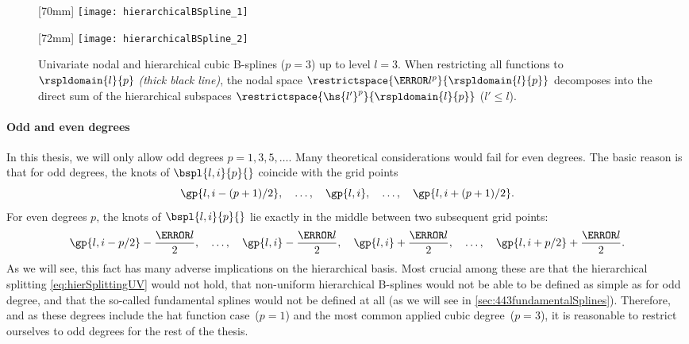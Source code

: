\begin{figure}
  [70mm]{%
    \texttt{[image: hierarchicalBSpline\_1]}%
  }%
  \hfill%
  \hfill%
  [72mm]{%
    \texttt{[image: hierarchicalBSpline\_2]}%
  }%
  \caption[%
    Nodal and hierarchical B-splines%
  ]{%
    Univariate nodal and hierarchical cubic B-splines ($p = 3$)
    up to level $l = 3$.
    When restricting all functions to $\rspldomain{l}{p}$ \emph{(thick black line)},
    the nodal space $\restrictspace{\ns{l}^p}{\rspldomain{l}{p}}$ decomposes into the direct sum
    of the hierarchical subspaces $\restrictspace{\hs{l'}^p}{\rspldomain{l}{p}}$ ($l' \le l$).%
  }%
  \label{fig:hierarchicalBSpline}%
\end{figure}

\paragraph{Odd and even degrees}

In this thesis, we will only allow odd degrees $p = 1, 3, 5, \dotsc$.
Many theoretical considerations would fail for even degrees.
The basic reason is that for odd degrees, the knots of
$\bspl{l,i}{p}{}$ coincide with the grid points \cite{Valentin14Hierarchische}
\begin{equation}
  \gp{l,i-(p+1)/2},\quad
  \dotsc,\quad
  \gp{l,i},\quad
  \dotsc,\quad
  \gp{l,i+(p+1)/2}.
\end{equation}
For even degrees $p$, the knots of $\bspl{l,i}{p}{}$ lie exactly in
the middle between two subsequent grid points:
\begin{equation}
  \gp{l,i-p/2} - \frac{\ms{l}}{2},\quad
  \dotsc,\quad
  \gp{l,i} - \frac{\ms{l}}{2},\quad
  \gp{l,i} + \frac{\ms{l}}{2},\quad
  \dotsc,\quad
  \gp{l,i+p/2} + \frac{\ms{l}}{2}.
\end{equation}
As we will see,
this fact has many adverse implications on the hierarchical basis.
Most crucial among these are
that the hierarchical splitting \eqref{eq:hierSplittingUV} would not hold,
that non-uniform hierarchical B-splines would not be able to be defined as
simple as for odd degree, and
that the so-called fundamental splines would not be defined at all
(as we will see in \cref{sec:443fundamentalSplines}).
Therefore, and
as these degrees include the hat function case~($p = 1$) and the
most common applied cubic degree~($p = 3$),
it is reasonable to restrict ourselves to odd degrees
for the rest of the thesis.




